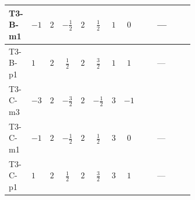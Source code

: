 \documentclass[8pt]{article}
\begin{document}
\begin{landscape}
\begin{longtable}{@{}llcccccc >{\raggedright\arraybackslash}p{0.21\linewidth} >{\raggedright\arraybackslash}p{0.21\linewidth} >{\raggedright\arraybackslash}p{0.21\linewidth}@{}}
\midrule
T3-B-m1 & $-1$ & $2$ & $-\frac{1}{2}$ & $2$ & $\frac{1}{2}$ & $1$ & $0$ & \scriptsize\adjustbox{max width=\linewidth}{$\begin{gathered} +16 {\lambda_5} \left({\lambda_5}\right)^{*}\end{gathered}$} & --- & \scriptsize\adjustbox{max width=\linewidth}{$\begin{gathered} -9 {g_2}^2 {\lambda_{HS_2}^{(A)}}\end{gathered}$} \\
\midrule
T3-B-p1 & $1$ & $2$ & $\frac{1}{2}$ & $2$ & $\frac{3}{2}$ & $1$ & $1$ & \scriptsize\adjustbox{max width=\linewidth}{$\begin{gathered} +16 {\lambda_5} \left({\lambda_5}\right)^{*}\end{gathered}$} & --- & \scriptsize\adjustbox{max width=\linewidth}{$\begin{gathered} -9 {g_2}^2 {\lambda_{HS_2}^{(A)}}\end{gathered}$} \\
\midrule
T3-C-m3 & $-3$ & $2$ & $-\frac{3}{2}$ & $2$ & $-\frac{1}{2}$ & $3$ & $-1$ & \scriptsize\adjustbox{max width=\linewidth}{$\begin{gathered} +16 {\lambda_5} \left({\lambda_5}\right)^{*}\end{gathered}$} & \scriptsize\adjustbox{max width=\linewidth}{$\begin{gathered} +{g_1}^2 \left(-6 {g_2}^2-3 {\lambda_{HS_2}^{(A)}}\right)\end{gathered}$} & \scriptsize\adjustbox{max width=\linewidth}{$\begin{gathered} -9 {g_2}^2 {\lambda_{HS_2}^{(A)}}\end{gathered}$} \\
\midrule
T3-C-m1 & $-1$ & $2$ & $-\frac{1}{2}$ & $2$ & $\frac{1}{2}$ & $3$ & $0$ & \scriptsize\adjustbox{max width=\linewidth}{$\begin{gathered} +16 {\lambda_5} \left({\lambda_5}\right)^{*}\end{gathered}$} & --- & \scriptsize\adjustbox{max width=\linewidth}{$\begin{gathered} -9 {g_2}^2 {\lambda_{HS_2}^{(A)}}\end{gathered}$} \\
\midrule
T3-C-p1 & $1$ & $2$ & $\frac{1}{2}$ & $2$ & $\frac{3}{2}$ & $3$ & $1$ & \scriptsize\adjustbox{max width=\linewidth}{$\begin{gathered} +16 {\lambda_5} \left({\lambda_5}\right)^{*}\end{gathered}$} & --- & \scriptsize\adjustbox{max width=\linewidth}{$\begin{gathered} -9 {g_2}^2 {\lambda_{HS_2}^{(A)}}\end{gathered}$} \\

\end{longtable}
\end{landscape}
\end{document}
